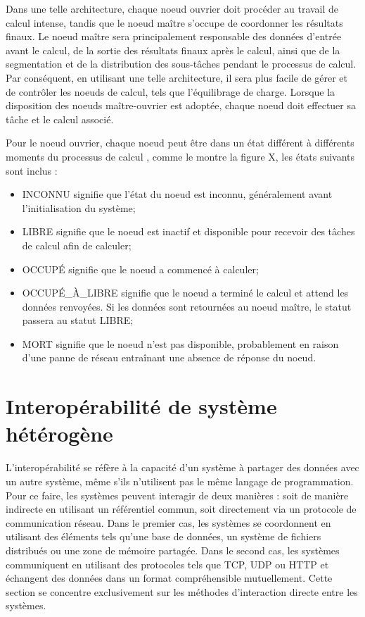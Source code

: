 Dans une telle architecture, chaque noeud ouvrier doit procéder au travail de calcul intense, tandis que le noeud maître s'occupe de coordonner les résultats finaux. Le noeud maître sera principalement responsable des données d'entrée avant le calcul, de la sortie des résultats finaux après le calcul, ainsi que de la segmentation et de la distribution des sous-tâches pendant le processus de calcul. Par conséquent, en utilisant une telle architecture, il sera plus facile de gérer et de contrôler les noeuds de calcul, tels que l'équilibrage de charge. Lorsque la disposition des noeuds maître-ouvrier est adoptée, chaque noeud doit effectuer sa tâche et le calcul associé.

Pour le noeud ouvrier, chaque noeud peut être dans un état différent à différents moments du processus de calcul \cite{Liu_2010}, comme le montre la figure X, les états suivants sont inclus :
\begin{itemize}
    \item INCONNU signifie que l'état du noeud est inconnu, généralement avant l'initialisation du système;
    \item LIBRE signifie que le noeud est inactif et disponible pour recevoir des tâches de calcul afin de calculer;
    \item OCCUPÉ signifie que le noeud a commencé à calculer;
    \item OCCUPÉ\_À\_LIBRE signifie que le noeud a terminé le calcul et attend les données renvoyées. Si les données sont retournées au noeud maître, le statut passera au statut LIBRE;
    \item MORT signifie que le noeud n'est pas disponible, probablement en raison d'une panne de réseau entraînant une absence de réponse du noeud.
\end{itemize}

\section{Interopérabilité de système hétérogène}

L'interopérabilité se réfère à la capacité d'un système à partager des données avec un autre système, même s'ils n'utilisent pas le même langage de programmation. Pour ce faire, les systèmes peuvent interagir de deux manières : soit de manière indirecte en utilisant un référentiel commun, soit directement via un protocole de communication réseau. Dans le premier cas, les systèmes se coordonnent en utilisant des éléments tels qu'une base de données, un système de fichiers distribués ou une zone de mémoire partagée. Dans le second cas, les systèmes communiquent en utilisant des protocoles tels que TCP, UDP ou HTTP et échangent des données dans un format compréhensible mutuellement. Cette section se concentre exclusivement sur les méthodes d'interaction directe entre les systèmes.

